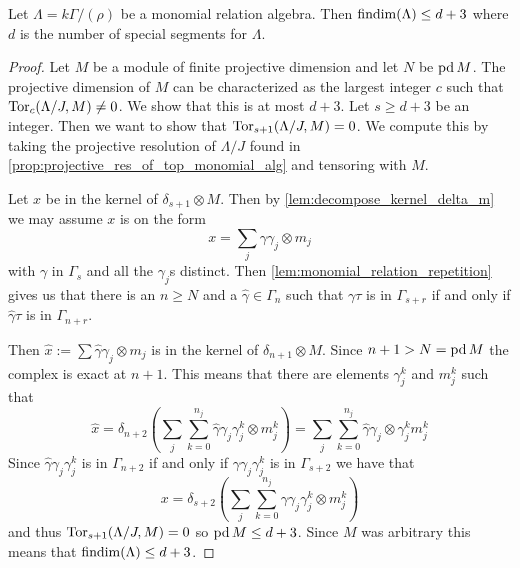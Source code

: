 \begin{theorem}\cite[Corollary~2.4]{GKK91}\label{thm:monomial_algebra_satisafies_FDC}
	Let $\Lambda = k\Gamma/(\rho)$ be a monomial relation algebra. Then $\operatorname{findim}(\Lambda) \leq d+3$ where $d$ is the number of special segments for $\Lambda$.
	\begin{proof}
		Let $M$ be a module of finite projective dimension and let $N$ be $\operatorname{pd} M$. The projective dimension of $M$ can be characterized as the largest integer $c$ such that $\operatorname{Tor}_c(\Lambda/J, M) \neq 0$. We show that this is at most $d+3$. Let $s \geq d+3$ be an integer. Then we want to show that $\operatorname{Tor}_{s+1}(\Lambda/J, M)=0$. We compute this by taking the projective resolution of $\Lambda/J$ found in \cref{prop:projective_res_of_top_monomial_alg} and tensoring with $M$.
		\begin{center}
		\end{center}
		Let $x$ be in the kernel of $\delta_{s+1}\otimes M$. Then by \cref{lem:decompose_kernel_delta_m} we may assume $x$ is on the form
		$$x = \sum_j \gamma \gamma_j \otimes m_j$$
		with $\gamma$ in $\Gamma_s$ and all the $\gamma_j$s distinct. Then \cref{lem:monomial_relation_repetition} gives us that there is an $n \geq N$ and a $\hat{\gamma} \in \Gamma_n$ such that $\gamma\tau$ is in $\Gamma_{s+r}$ if and only if $\hat{\gamma}\tau$ is in $\Gamma_{n+r}$.
		
		Then $\hat{x} := \sum \hat{\gamma}\gamma_j \otimes m_j$ is in the kernel of $\delta_{n+1}\otimes M$. Since $n+1>N=\operatorname{pd} M$ the complex is exact at $n+1$. This means that there are elements $\gamma_j^k$ and $m_j^k$ such that
		$$\hat{x} = \delta_{n+2} \left(\sum_j \sum_{k=0}^{n_j} \hat{\gamma}\gamma_j\gamma_j^k \otimes m_j^k\right) = 
		\sum_j \sum_{k=0}^{n_j} \hat{\gamma}\gamma_j \otimes \gamma_j^k m_j^k$$
		Since $\hat{\gamma}\gamma_j\gamma_j^k$ is in $\Gamma_{n+2}$ if and only if $\gamma\gamma_j\gamma_j^k$ is in $\Gamma_{s+2}$ we have that
		$$x = \delta_{s+2} \left(\sum_j \sum_{k=0}^{n_j} {\gamma}\gamma_j\gamma_j^k \otimes m_j^k\right)$$
		and thus $\operatorname{Tor}_{s+1}(\Lambda/J, M)=0$ so $\operatorname{pd} M \leq d+3$. Since $M$ was arbitrary this means that $\operatorname{findim}(\Lambda) \leq d+3$. 
	\end{proof}
\end{theorem}



